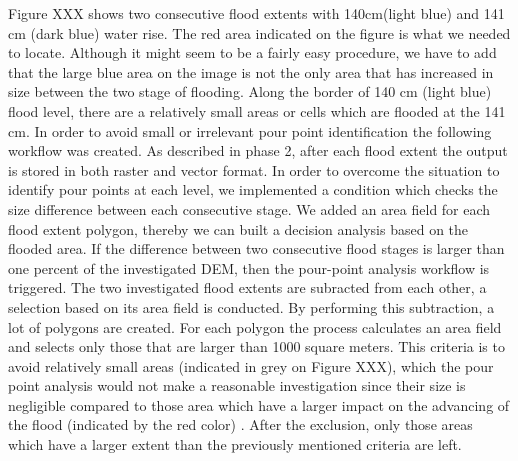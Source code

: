 Figure XXX shows two consecutive flood extents with 140cm(light blue) and 141 cm (dark blue) water rise. The red area indicated on the figure is what we needed to locate. Although it might seem to be a fairly easy procedure, we have to add that the large blue area on the image is not the only area that has increased in size between the two stage of flooding. Along the border of 140 cm (light blue) flood level, there are a relatively small areas or cells  which are flooded at the 141 cm. In order to avoid small or irrelevant pour point identification the following workflow was created. 
As described in phase 2, after each flood extent the output is stored in both raster and vector format. In order to overcome the situation to identify pour points at each level, we implemented a condition which checks the size difference between each consecutive stage. We added an area field for each flood extent polygon, thereby we can built a decision analysis based on the flooded area. If the difference between two consecutive flood stages is larger than one percent of the investigated DEM, then the pour-point analysis workflow is triggered. The two investigated flood extents are subracted from each other, a selection based on its area field is conducted. By performing this subtraction, a lot of polygons are created. For each polygon the process calculates an area field and selects only those that are larger than 1000 square meters. This criteria is to avoid relatively small areas (indicated in grey on Figure XXX), which the pour point analysis would not make a reasonable investigation since their size is negligible compared to those area which have a larger impact on the advancing of the flood (indicated by the red color) . After the exclusion, only those areas which have a larger extent than the previously mentioned criteria are left.\\

